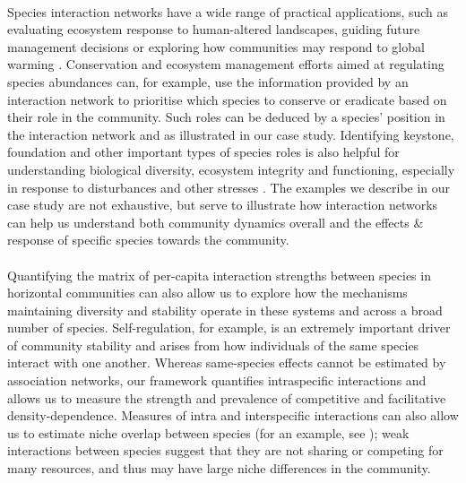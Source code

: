 \documentclass[a4,12pt]{article}
\begin{document}
    \paragraph{}
    Species interaction networks have a wide range of practical applications, such as evaluating ecosystem response to human-altered landscapes, guiding future management decisions \parencite{Ross2011} or exploring how communities may respond to global warming \parencite{Gorman2019}. Conservation and ecosystem management efforts aimed at regulating species abundances can, for example, use the information provided by an interaction network to prioritise which species to conserve or eradicate based on their role in the community. Such roles can be deduced by a species' position in the interaction network \parencite{Cirtwill2018a} and as illustrated in our case study. Identifying keystone, foundation and other important types of species roles is also helpful for understanding biological diversity, ecosystem integrity and functioning, especially in response to disturbances and other stresses \parencite{Nyakatya2008, Orwin2016, Losapio2017, Narwani2019}. The examples we describe in our case study are not exhaustive, but serve to illustrate how interaction networks can help us understand both community dynamics overall and the effects \& response of specific species towards the community. 

    \paragraph{}
    Quantifying the matrix of per-capita interaction strengths between species in horizontal communities can also allow us to explore how the mechanisms maintaining diversity and stability operate in these systems and across a broad number of species. Self-regulation, for example, is an extremely important driver of community stability \parencite{Barabas2017} and arises from how individuals of the same species interact with one another. Whereas same-species effects cannot be estimated by association networks, our framework quantifies intraspecific interactions and allows us to measure the strength and prevalence of competitive and facilitative density-dependence. Measures of intra and interspecific interactions can also allow us to estimate niche overlap between species (for an example, see \cite{Chu2015a}); weak interactions between species suggest that they are not sharing or competing for many resources, and thus may have large niche differences in the community. %
\end{document}

